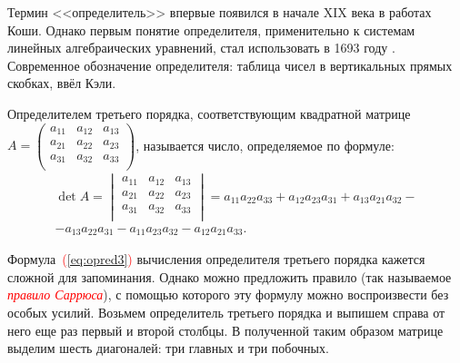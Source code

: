 \documentclass[10pt]{article}
\newenvironment{defnt}%
{\begin{center}\fboxsep=1.6\fboxrule \shadowsize=4pt\begin{Sbox}
\begin{minipage}[c]{0.58\textwidth}}%
{\end{minipage}\end{Sbox}\shadowbox{\fboxsep=5pt\colorbox[rgb]{1,0.725,0.474}{\TheSbox}}
\end{center}}
\numberwithin{primer}{section}
\newcommand{\term}[1]{\textcolor{red}{\emph{#1}}}
\numberwithin{equation}{section}
\newcommand{\refform}[1]{\textcolor{red}{(\ref{#1})}}
\begin{document}
Термин <<определитель>> впервые появился в начале XIX века в
работах Коши. Однако первым понятие определителя, применительно к
системам линейных алгебраических уравнений, стал использовать в 1693
году . Современное обозначение определителя:
таблица чисел в вертикальных прямых скобках, ввёл Кэли.

\begin{defnt}
Определителем третьего порядка, соответствующим квадратной матрице
$A=\begin{pmatrix}
  a_{11} & a_{12} & a_{13}\\
  a_{21} & a_{22} & a_{23}\\
  a_{31} & a_{32} & a_{33}\\
\end{pmatrix}$,
называется число, определяемое по формуле: \begin{multline}\label{eq:opred3}
\det A=\begin{vmatrix}
  a_{11} & a_{12} & a_{13}\\
  a_{21} & a_{22} & a_{23}\\
  a_{31} & a_{32} & a_{33}\\
\end{vmatrix}
=a_{11}a_{22}a_{33}+a_{12}a_{23}a_{31}+a_{13}a_{21}a_{32}-\\
-a_{13}a_{22}a_{31}-a_{11}a_{23}a_{32}-a_{12}a_{21}a_{33}.
\end{multline}
\end{defnt}

Формула~\refform{eq:opred3} вычисления определителя третьего порядка кажется
сложной для запоминания. Однако можно предложить правило
(так называемое \term{правило Саррюса}), с
помощью которого эту формулу можно воспроизвести без особых
усилий. Возьмем определитель третьего порядка и выпишем справа от
него еще раз первый и второй столбцы. В полученной таким образом
матрице выделим шесть диагоналей: три главных и три побочных.
\end{document}
